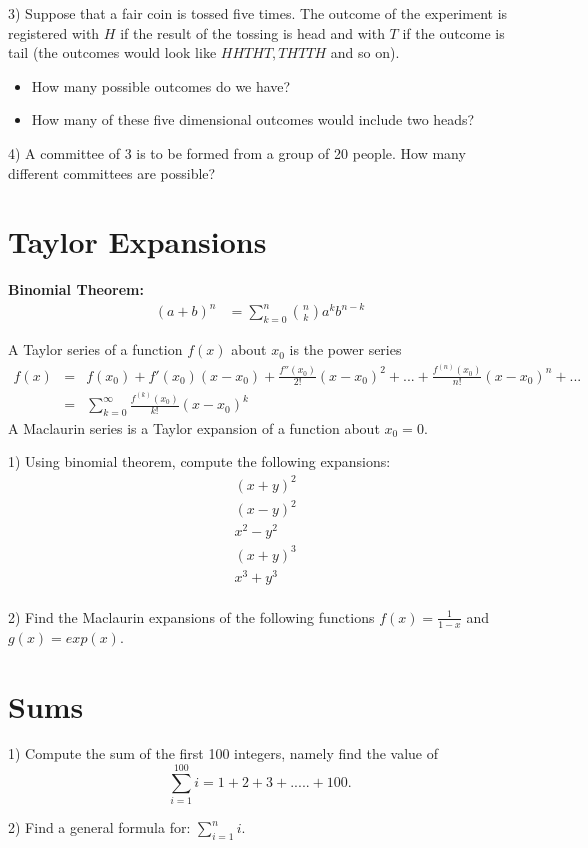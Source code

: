 \documentclass[12pt,a4paper,titlepage]{article}
\begin{document}
3) Suppose that a fair coin is tossed five times. The outcome of the experiment is registered with $ H $ if the result of the tossing is head and with $ T $ if the outcome is tail (the outcomes would look like $ HHTHT, THTTH $ and so on).
\begin{itemize}
  \item How many possible outcomes do we have?
  \item How many of these five dimensional outcomes would include two heads?
\end{itemize}

4) A committee of 3 is to be formed from a group of 20 people. How many different committees are possible?

\vspace{1cm}



\section{Taylor Expansions}


\textbf{Binomial Theorem:}
\begin{align}
(a+b)^{n}&=\sum_{k=0}^{n}{n \choose k} a^{k} b^{n-k}
\end{align}

A Taylor series of a function $ f(x) $ about $ x_0 $ is the power series
\begin{eqnarray}
f(x)&=&f(x_0)+f'(x_0)(x-x_0)+\frac{f''(x_0)}{2!}(x-x_0)^{2}+...+\frac{f^{(n)}(x_0)}{n!}(x-x_0)^{n}+... \\
&=& \sum_{k=0}^\infty \frac{f^{(k)}(x_0)}{k!}(x-x_0)^{k}
\end{eqnarray}
A Maclaurin series is a Taylor expansion of a function about $ x_0=0 $.\newline

1) Using binomial theorem, compute the following expansions:
\begin{align*}
 &(x+y)^{2}  \\
 &(x-y)^{2}\\
 &x^{2}-y^{2}\\
 &(x+y)^{3} \\
 &x^{3}+y^{3}\\
\end{align*}

2) Find the Maclaurin expansions of the following functions
$ f(x)=\frac{1}{1-x} $ and $ g(x)=exp(x)$.


\vspace{1cm}



\section{Sums}

1) Compute the sum of the first 100 integers, namely find the value of
$$
\sum_{i=1}^{100} i =1 +2 + 3+ .....+100.
$$

2) Find a general formula for: $\sum_{i=1}^n i$.
\end{document}
